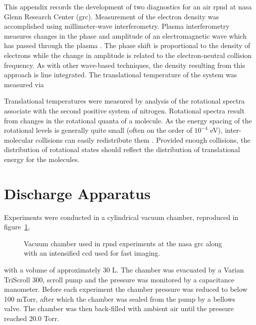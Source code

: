 This appendix records the development of two diagnostics for an air \acs{rpnd}
at \acs{nasa} Glenn Research Center (\acs{grc}). Measurement of the electron
density was accomplished using millimeter-wave interferometry. Plasma
interferometry measures changes in the phase and amplitude of an electromagnetic
wave which has passed through the plasma \cite{Lieberman2005}. The phase shift
is proportional to the density of electrons while the change in amplitude is
related to the electron-neutral collision frequency. As with other wave-based
techniques, the density resulting from this approach is line integrated. The
translational temperature of the system was measured via

Translational temperatures were measured by analysis of the rotational spectra
associate with the second positive system of nitrogen. Rotational spectra result
from changes in the rotational quanta of a molecule. As the energy spacing of
the rotational levels is generally quite small (often on the order of $10^{-4}$
eV), inter-molecular collisions can easily redistribute them
\cite{Herzberg1950}. Provided enough collisions, the distribution of rotational
states should reflect the distribution of translational energy for the
molecules.

\section{Discharge Apparatus}\label{sec:apparatus2}

Experiments were conducted in a cylindrical vacuum chamber, reproduced in
figure~\ref{fig:nasachamber},
\begin{figure}
  \centering
  \setlength\fboxsep{0pt}
  \setlength\fboxrule{1.0pt}
  \caption{Vacuum chamber used in \acs{rpnd} experiments at the \acs{nasa}
    \acs{grc} along with an intensified \acs{ccd} used for fast imaging.}
  \label{fig:nasachamber}
\end{figure}
with a volume of approximately 30 L. The chamber was evacuated by a Varian
TriScroll 300, scroll pump and the pressure was monitored by a capacitance
manometer. Before each experiment the chamber pressure was reduced to below 100
mTorr, after which the chamber was sealed from the pump by a bellows valve. The
chamber was then back-filled with ambient air until the pressure reached 20.0
Torr.

